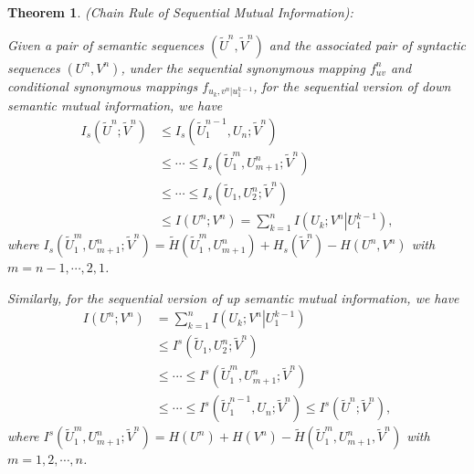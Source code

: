 \documentclass[12pt, draftclsnofoot,onecolumn]{IEEEtran}
\newtheorem{theorem}{\bf{Theorem}}
\begin{document}
\begin{theorem}\label{chainrule_SMI}
(\textit{Chain Rule of Sequential Mutual Information}):

Given a pair of semantic sequences $(\tilde {U}^n,\tilde {V}^n)$ and the associated pair of syntactic sequences $\left(U^n,V^n\right)$, under the sequential synonymous mapping $f_{uv}^n$ and conditional synonymous mappings $f_{u_k,v^n|u_1^{k-1}}$, for the sequential version of down semantic mutual information, we have
\begin{equation}
\begin{aligned}
I_s(\tilde{U}^n;\tilde{V}^n)&\leq I_s(\tilde{U}_1^{n-1},U_n;\tilde{V}^n)\\
& \leq \cdots \leq I_s(\tilde{U}_1^m,U_{m+1}^n;\tilde{V}^n) \\
&\leq \cdots \leq I_s(\tilde{U}_1,U_{2}^n;\tilde{V}^n) \\
& \leq I(U^n;V^n)=\sum_{k=1}^{n} I(U_k;V^n\left|U_1^{k-1}\right.),
\end{aligned}
\end{equation}
where $I_s(\tilde{U}_1^m,U_{m+1}^n;\tilde{V}^n)=\tilde{H}(\tilde{U}_1^m,U_{m+1}^n)+H_s(\tilde{V}^n)-H(U^n,V^n)$ with $m=n-1,\cdots,2,1$.

Similarly, for the sequential version of up semantic mutual information, we have
\begin{equation}
\begin{aligned}
I(U^n;V^n)&=\sum_{k=1}^{n} I(U_k;V^n\left|U_1^{k-1}\right.)\\
&\leq I^s(\tilde{U}_1,U_{2}^n;\tilde{V}^n)\\
& \leq \cdots \leq I^s(\tilde{U}_1^m,U_{m+1}^n;\tilde{V}^n)\\
& \leq \cdots \leq I^s(\tilde{U}_1^{n-1},U_n;\tilde{V}^n)\leq I^s(\tilde{U}^n;\tilde{V}^n),
\end{aligned}
\end{equation}
where $I^s(\tilde{U}_1^m,U_{m+1}^n;\tilde{V}^n) =H(U^n)+H(V^n)-\tilde{H}(\tilde{U}_1^m,U_{m+1}^n,\tilde{V}^n)$ with $m=1,2,\cdots,n$.
\end{theorem}
\end{document}
